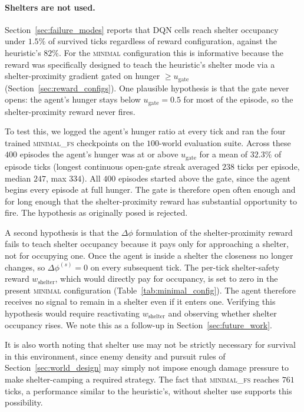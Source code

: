 \documentclass[12pt,a4paper,titlepage]{article}
\begin{document}
\paragraph{Shelters are not used.}
Section~\ref{sec:failure_modes} reports that DQN cells reach shelter occupancy under $1.5\%$ of survived ticks regardless of reward configuration, against the heuristic's $82\%$. For the \textsc{minimal} configuration this is informative because the reward was specifically designed to teach the heuristic's shelter mode via a shelter-proximity gradient gated on hunger $\geq u_\text{gate}$ (Section~\ref{sec:reward_configs}). One plausible hypothesis is that the gate never opens: the agent's hunger stays below $u_\text{gate} = 0.5$ for most of the episode, so the shelter-proximity reward never fires.

To test this, we logged the agent's hunger ratio at every tick and ran the four trained \textsc{minimal\_fs} checkpoints on the $100$-world evaluation suite. Across these $400$ episodes the agent's hunger was at or above $u_\text{gate}$ for a mean of $32.3\%$ of episode ticks (longest continuous open-gate streak averaged $238$ ticks per episode, median $247$, max $334$). All $400$ episodes started above the gate, since the agent begins every episode at full hunger. The gate is therefore open often enough and for long enough that the shelter-proximity reward has substantial opportunity to fire. The hypothesis as originally posed is rejected.

A second hypothesis is that the $\Delta\phi$ formulation of the shelter-proximity reward fails to teach shelter occupancy because it pays only for approaching a shelter, not for occupying one. Once the agent is inside a shelter the closeness no longer changes, so $\Delta\phi^{(s)} = 0$ on every subsequent tick. The per-tick shelter-safety reward $w_\text{shelter}$, which would directly pay for occupancy, is set to zero in the present \textsc{minimal} configuration (Table~\ref{tab:minimal_config}). The agent therefore receives no signal to remain in a shelter even if it enters one. Verifying this hypothesis would require reactivating $w_\text{shelter}$ and observing whether shelter occupancy rises. We note this as a follow-up in Section~\ref{sec:future_work}.

It is also worth noting that shelter use may not be strictly necessary for survival in this environment, since enemy density and pursuit rules of Section~\ref{sec:world_design} may simply not impose enough damage pressure to make shelter-camping a required strategy. The fact that \textsc{minimal\_fs} reaches $761$ ticks, a performance similar to the heuristic's, without shelter use supports this possibility.
\end{document}
